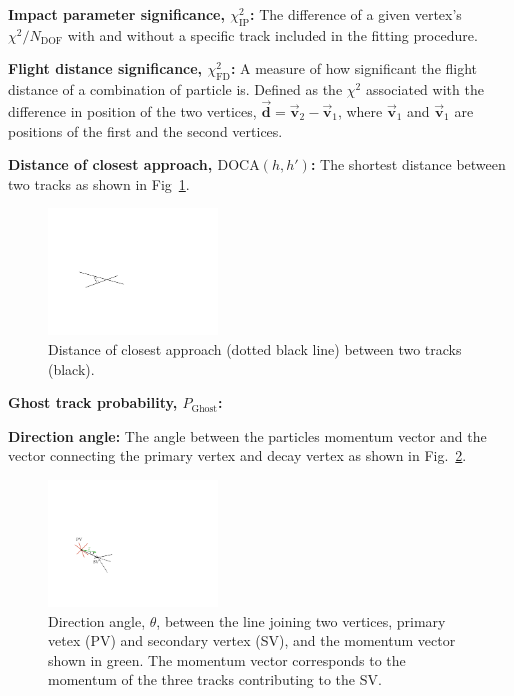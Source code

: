 \begin{description}
\item \textbf{Impact parameter significance, $\chi^{2}_{\text{IP}}$:} The difference of a given vertex's $\chi^{2}/N_{\text{DOF}}$ with and without a specific track included in the fitting procedure.
\item \textbf{Flight distance significance, $\chi^{2}_{\text{FD}}$:} A measure of how significant the flight distance of a combination of particle is. Defined as the $\chi^{2}$ associated with the difference in position of the two vertices, $\vec{\mathbf{d}} = \vec{\mathbf{v}}_2 - \vec{\mathbf{v}}_1$, where $\vec{\mathbf{v}}_1$ and $\vec{\mathbf{v}}_1$ are positions of the first and the second vertices. 
\item \textbf{Distance of closest approach, $\text{DOCA}(h,h')$:} The shortest distance between two tracks as shown in Fig~\ref{fig:doca}.
\begin{figure}[!h]
    \centering
    \includegraphics[width=0.4\textwidth]{figs/Selection/DOCA.pdf}
    \caption{Distance of closest approach (dotted black line) between two tracks (black).}
    \label{fig:doca}   
\end{figure}


\item \textbf{Ghost track probability, $P_{\text{Ghost}}$:} 
\item \textbf{Direction angle:} The angle between the particles momentum vector and the vector connecting the primary vertex and decay vertex as shown in Fig.~\ref{fig:dira}.

\begin{figure}[!h]
    \centering
    \includegraphics[width=0.4\textwidth]{figs/Selection/DIRA.pdf}
    \caption{Direction angle, $\theta$, between the line joining two vertices, primary vetex (PV) and secondary vertex (SV), and the momentum vector shown in green. The momentum vector corresponds to the momentum of the three tracks contributing to the SV. }
    \label{fig:dira}   
\end{figure}



\end{description}
